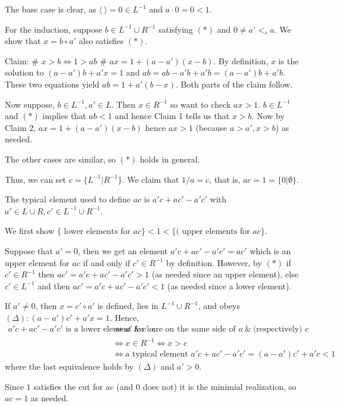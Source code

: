 The base case is clear, as $\langle \ \rangle = 0\in L^{-1}$ and $a\cdot 0 = 0 < 1$.

For the induction, suppose $b\in L^{-1}\cup R^{-1}$ satisfying $(*)$ and $0\neq a' <_s a$. We show that $x = b\circ a'$ also satisfies $(*)$.

Claim:
# $x > b \Leftrightarrow 1 > ab$
# $ax = 1 + (a-a')(x-b)$.
By definition, $x$ is the solution to $(a-a')b + a'x = 1$ and $ab = ab - a'b + a'b = (a-a')b + a'b$. These two equations yield $ab = 1 + a'(b-x)$. Both parts of the claim follow.

Now suppose, $b\in L^{-1}, a'\in L$. Then $x\in R^{-1}$ so want to check $ax > 1$.
$b\in L^{-1}$ and $(*)$ implies that $ab < 1$ and hence Claim 1 tells us that $x > b$. Now by Claim 2, $ax = 1 + (a-a')(x-b)$ hence $ax > 1$ (because $a>a', x>b$) as needed.

The other cases are similar, so $(*)$ holds in general.

Thus, we can set $c = \{L^{-1} | R^{-1} \}$. We claim that $1/a = c$, that is, $ac = 1 = \{0 | \emptyset\}$.

The typical element used to define $ac$ is $a'c + ac' - a'c'$ with $a'\in L\cup R, c'\in L^{-1}\cup R^{-1}$.

We first show $\{\text{ lower elements for }ac\} < 1 < \{(\text{ upper elements for }ac \}$.

Suppose that $a' = 0$, then we get an element $a'c + ac' - a'c' = ac'$ which is an upper element for $ac$ if and only if $c'\in R^{-1}$ by definition. However, by $(*)$ if $c'\in R^{-1}$ then $ac' = a'c + ac' - a'c' > 1$ (as needed since an upper element), else $c'\in L^{-1}$ and then $ac' = a'c + ac' - a'c' < 1$ (as needed since a lower element).

If $a'\neq 0$, then $x = c'\circ a'$ is defined, lies in $L^{-1}\cup R^{-1}$, and obeys $(\Delta): (a-a')c' + a'x = 1$. Hence,
\begin{align*}
a'c + ac' - a'c' \text{ is a lower element for } ac &\Leftrightarrow a' \ \&\ c' \text{ are on the same side of } a \ \&\ \text{(respectively) } c \\
&\Leftrightarrow x\in R^{-1} \Leftrightarrow x > c \\
&\Leftrightarrow \text{a typical element } a'c + ac' - a'c' = (a-a')c' + a'c < 1
\end{align*}
where the last equivalence holds by $(\Delta)$ and $a'>0$.

Since $1$ satisfies the cut for $ac$ (and $0$ does not) it is the minimial realization, so $ac = 1$ as needed.

